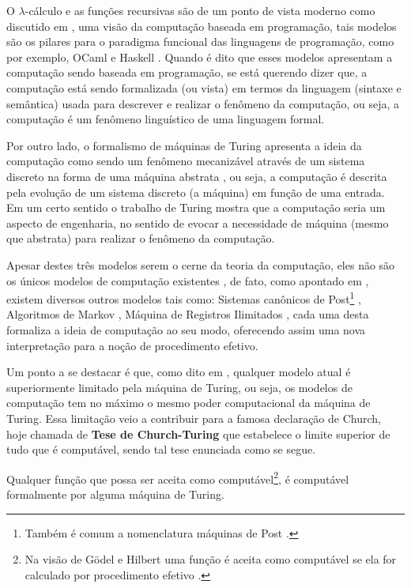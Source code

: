 O $\lambda$-cálculo e as funções recursivas \cite{cutland1980, fitting2011, odifreddi1992} são de um ponto de vista moderno como discutido em \cite{hankin2004}, uma visão da computação baseada em programação, tais modelos são os pilares para o paradigma funcional das linguagens de programação, como por exemplo, OCaml e Haskell \cite{hankin2004}. Quando é dito que esses modelos apresentam a computação sendo baseada em programação, se está querendo dizer que, a computação está sendo formalizada (ou vista) em termos da linguagem (sintaxe e semântica) usada para descrever e realizar o fenômeno da computação, ou seja, a computação é um fenômeno linguístico de uma linguagem formal. 

Por outro lado, o formalismo de máquinas de Turing apresenta a ideia da computação como sendo um fenômeno mecanizável através de um sistema discreto na forma de uma máquina abstrata \cite{hankin2004, sernadas2006}, ou seja, a computação é descrita pela evolução de um sistema discreto (a máquina) em função de uma entrada. Em um certo sentido o trabalho de Turing mostra que a computação seria um aspecto de engenharia, no sentido de evocar a necessidade de máquina (mesmo que abstrata) para realizar o fenômeno da computação.

Apesar destes três modelos serem o cerne da teoria da computação, eles não são os únicos modelos de computação existentes \cite{roberto1998}, de fato, como apontado em \cite{menezes2003}, existem diversos outros modelos tais como: Sistemas canônicos de Post\footnote{Também é comum a nomenclatura máquinas de Post \cite{nelson1968}.} \cite{fitting2011}, Algoritmos de Markov \cite{menezes2003}, Máquina de Registros Ilimitados \cite{cutland1980, menezes2003}, cada uma desta formaliza a ideia de computação ao seu modo, oferecendo assim uma nova interpretação para a noção de procedimento efetivo. 

Um ponto a se destacar é que, como dito em \cite{sernadas2006}, qualquer modelo atual é superiormente limitado pela máquina de Turing, ou seja, os modelos de computação tem no máximo o mesmo poder computacional da máquina de Turing. Essa limitação veio a contribuir para a famosa declaração de Church, hoje chamada de \textbf{Tese de Church-Turing} que estabelece o limite superior de tudo que é computável, sendo tal tese enunciada como se segue.

\begin{tese}
	\cite{sernadas2006} Qualquer função que possa ser aceita como computável\footnote{Na visão de Gödel e Hilbert uma função é aceita como computável se ela for calculado por procedimento efetivo \cite{fonseca2007}.}, é computável formalmente por alguma máquina de Turing.
\end{tese}

